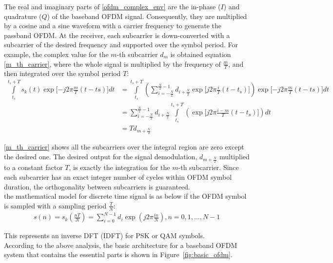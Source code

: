 The real and imaginary parts of \ref{ofdm_complex_env} are the in-phase ($I$) and quadrature ($Q$) of the baseband OFDM signal. Consequently, they are multiplied by a cosine and a sine waveform with a carrier frequency to generate the passband OFDM. At the receiver, each subcarrier is down-converted with a subcarrier of the desired frequency and supported over the symbol period. For example, the complex value for the $m$-th subcarrier $d_{m}$ is obtained equation \ref{m_th_carrier}, where the whole signal is multiplied by the frequency of $\frac{m}{T}$, and then integrated over the symbol period $T$:
\begin{equation} \label{m_th_carrier}
\begin{split}
\int\limits_{t_{s}}^{t_{s} + T} s_{k}(t) \exp \lbrack -j2\pi \frac{m}{T} (t-ts) \rbrack dt & = \int\limits_{t_{s}}^{t_{s} + T}  \left( \sum\limits_{i=-\frac{N}{2}}^{\frac{N}{2}-1} d_{i+\frac{N}{2}} \exp\lbrack j2\pi\frac{i}{T}(t- t_{s})\rbrack\right) \exp \lbrack -j2\pi \frac{m}{T} (t-ts) \rbrack dt\\
& = \sum\limits_{i=-\frac{N}{2}}^{\frac{N}{2}-1} d_{i+\frac{N}{2}} \int\limits_{t_{s}}^{t_{s} + T}  \left( \exp\lbrack j2\pi\frac{i-m}{T}(t- t_{s})\rbrack\right) dt\\
& = Td_{m+ \frac{N}{2}}
\end{split}
\end{equation}

\ref{m_th_carrier} shows all the subcarriers over the integral region are zero except the desired one. The desired output for the signal demodulation, $d_{m+ \frac{N}{2}}$ multiplied to a constant factor $T$, is exactly the integration for the $m$-th subcarrier. Since each subcarrier has an exact integer number of cycles within OFDM symbol duration, the orthogonality between subcarriers is guaranteed.\\
the mathematical model for discrete time signal is as below if the OFDM symbol is sampled with a sampling period $\frac{T}{N}$:
\begin{equation} \label{math_model}
\begin{split}
s(n)= s_{k}(\frac{nT}{N})= \sum\limits_{i=0}^{N-1} d_{i} \exp(j2\pi\frac{in}{N}), n= 0, 1, ... , N-1
\end{split}
\end{equation}

This represents an inverse DFT (IDFT) for PSK or QAM symbols.\\
According to the above analysis, the basic architecture for a baseband OFDM system that contains the essential parts is shown in Figure~\ref{fig:basic_ofdm}.\\

